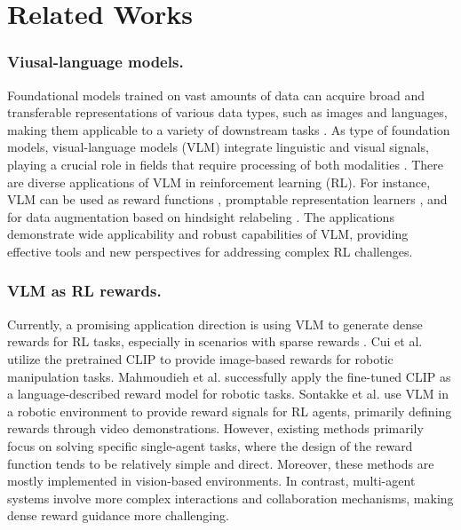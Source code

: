 \section{Related Works}
\subsubsection{Viusal-language models.}Foundational models trained on vast amounts of data can acquire broad and transferable representations of various data types, such as images and languages, making them applicable to a variety of downstream tasks \cite{wei2022emergent}. As type of foundation models, visual-language models (VLM) integrate linguistic and visual signals, playing a crucial role in fields that require processing of both modalities \cite{wang2021simvlm,ju2022prompting}. There are diverse applications of VLM in reinforcement learning (RL). For instance, VLM can be used as reward functions \cite{dang2023clip}, promptable representation learners \cite{chen2024vision}, and for data augmentation based on hindsight relabeling \cite{sumers2023distilling}. The applications demonstrate wide applicability and robust capabilities of VLM, providing effective tools and new perspectives for addressing complex RL challenges.

\subsubsection{VLM as RL rewards.}Currently, a promising application direction is using VLM to generate dense rewards for RL tasks, especially in scenarios with sparse rewards \cite{fu2024furl,rocamonde2023vision,wang2024rl}. Cui et al. \cite{cui2022can} utilize the pretrained CLIP to provide image-based rewards for robotic manipulation tasks. Mahmoudieh et al. \cite{mahmoudieh2022zero} successfully apply the fine-tuned CLIP as a language-described reward model for robotic tasks. Sontakke et al. \cite{sontakke2024roboclip} use VLM in a robotic environment to provide reward signals for RL agents, primarily defining rewards through video demonstrations. However, existing methods primarily focus on solving specific single-agent tasks, where the design of the reward function tends to be relatively simple and direct. Moreover, these methods are mostly implemented in vision-based environments. In contrast, multi-agent systems involve more complex interactions and collaboration mechanisms, making dense reward guidance more challenging.

